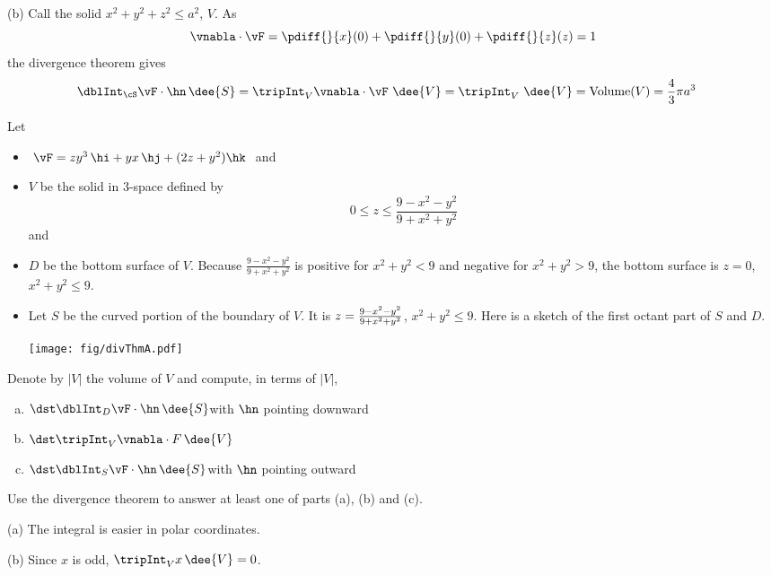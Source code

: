 \begin{solution}
(b) Call the solid $x^2+y^2+z^2\le a^2$, $V$.
As
\begin{equation*}
\vnabla\cdot\vF
=\pdiff{}{x}(0)
+\pdiff{}{y}(0)
+\pdiff{}{z}(z)
=1
\end{equation*}
the divergence theorem gives
\begin{align*}
\dblInt_{\cS}\vF\cdot\hn\,\dee{S}
&=\tripInt_V\vnabla\cdot\vF\ \dee{V}
=\tripInt_V \ \dee{V}
=\text{Volume}(V)
=\frac{4}{3}\pi a^3
\end{align*}
\end{solution}

\begin{question}
 Let 
\begin{itemize}\itemsep1pt \parskip0pt  %
\item
$\ \vF=zy^3\,\hi+yx\, \hj+(2z+y^2)\hk\ $ and
\item
 $V$ be the solid in 3-space defined by
$$
0\le z\le \frac{9-x^2-y^2}{9+x^2+y^2}
$$
and
\item
$D$ be the bottom surface of $V$.
Because $\frac{9-x^2-y^2}{9+x^2+y^2}$ is positive for 
$x^2+y^2< 9$ and negative for $x^2+y^2> 9$,
the bottom surface is $z=0$, $x^2+y^2\le 9$.
\item
Let $S$ be the curved portion of the boundary of $V$.
It is $z={9-x^2-y^2\over 9+x^2+y^2}$, $x^2+y^2\le 9$.
Here is a sketch of the first octant part of $S$ and $D$.
\begin{center}
       \texttt{[image: fig/divThmA.pdf]}
\end{center}
\end{itemize}
Denote by $|V|$ the volume of $V$ and compute, in terms of $|V|$,
\begin{enumerate}[(a)]
\item
$\dst\dblInt_{D}\vF\cdot \hn\,\dee{S}$\quad\quad with $\hn$ pointing downward
\item
$\dst\tripInt_V\vnabla\cdot F\,\dee{V}$
\item
$\dst\dblInt_S\vF\cdot\hn\,\dee{S}$\quad\quad with $\hn$ pointing outward
\end{enumerate}
Use the divergence theorem to answer at least one of parts (a), (b) and
(c).
\end{question}

\begin{hint} 
(a) The integral is easier in polar coordinates.

(b) Since $x$ is odd, $\tripInt_V x\,\dee{V}=0$.

\end{hint}

